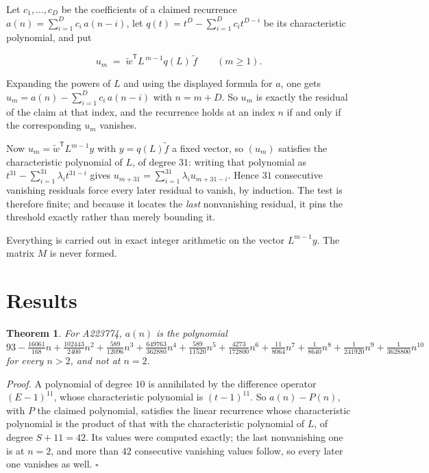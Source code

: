\documentclass[11pt]{article}
\newtheorem{theorem}{Theorem}
\theoremstyle{definition}
\begin{document}
Let $c_1,\dots,c_D$ be the coefficients of a claimed recurrence $a(n) = \sum_{i=1}^{D} c_i\,a(n-i)$, let $q(t) = t^{D} - \sum_{i=1}^{D} c_i t^{D-i}$ be its characteristic polynomial, and put

\[u_m \;=\; \tilde w^{\mathsf T} L^{\,m-1} q(L)\,\tilde f \qquad (m \ge 1).\]

Expanding the powers of $L$ and using the displayed formula for $a$, one gets $u_m = a(n) - \sum_{i=1}^{D} c_i\,a(n-i)$ with $n = m + D$. So $u_m$ is exactly the residual of the claim at that index, and the recurrence holds at an index $n$ if and only if the corresponding $u_m$ vanishes.

Now $u_m = \tilde w^{\mathsf T} L^{m-1} y$ with $y = q(L)\tilde f$ a fixed vector, so $(u_m)$ satisfies the characteristic polynomial of $L$, of degree $31$: writing that polynomial as $t^{31} - \sum_{i=1}^{31} \lambda_i t^{31-i}$ gives $u_{m+31} = \sum_{i=1}^{31} \lambda_i u_{m+31-i}$. Hence $31$ consecutive vanishing residuals force every later residual to vanish, by induction. The test is therefore finite; and because it locates the {\itshape last} nonvanishing residual, it pins the threshold exactly rather than merely bounding it.

Everything is carried out in exact integer arithmetic on the vector $L^{m-1}y$. The matrix $M$ is never formed.

\section{Results}

\begin{theorem} For A223774, $a(n)$ is the polynomial $93 - \frac{16061}{168}n + \frac{102443}{2400}n^{2} + \frac{589}{12096}n^{3} + \frac{649763}{362880}n^{4} + \frac{589}{11520}n^{5} + \frac{4273}{172800}n^{6} + \frac{11}{8064}n^{7} + \frac{1}{8640}n^{8} + \frac{1}{241920}n^{9} + \frac{1}{3628800}n^{10}$ for every $n > 2$, and not at $n = 2$.\end{theorem}

{\itshape Proof.} A polynomial of degree $10$ is annihilated by the difference operator $(E-1)^{11}$, whose characteristic polynomial is $(t-1)^{11}$. So $a(n) - P(n)$, with $P$ the claimed polynomial, satisfies the linear recurrence whose characteristic polynomial is the product of that with the characteristic polynomial of $L$, of degree $S + 11 = 42$. Its values were computed exactly; the last nonvanishing one is at $n = 2$, and more than $42$ consecutive vanishing values follow, so every later one vanishes as well. $\square$
\end{document}
